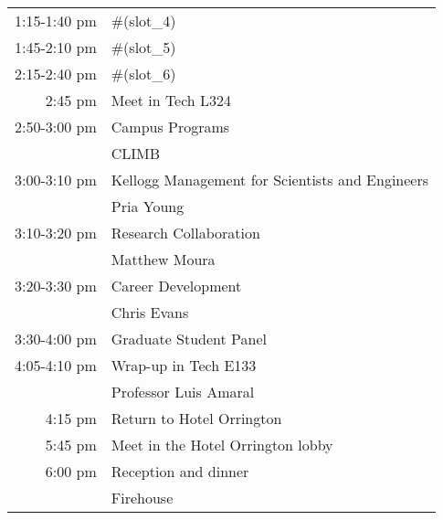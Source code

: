 \documentclass{article}
\begin{document}
\begin{tabular}{ r    l }
1:15-1:40 pm    & #(slot_4) \rule{0cm}{0.4cm} \\ 

1:45-2:10 pm    & #(slot_5) \rule{0cm}{0.4cm} \\ 
 
2:15-2:40 pm    & #(slot_6) \rule{0cm}{0.4cm} \\ 

2:45 pm         & Meet in Tech L324 \rule{0cm}{0.4cm} \\

2:50-3:00 pm    & Campus Programs \rule{0cm}{0.4cm} \\ 
                & \hspace{5mm} CLIMB \\ 

3:00-3:10 pm    & Kellogg Management for Scientists and Engineers \rule{0cm}{0.4cm} \\ 
                & \hspace{5mm} Pria Young \\ 

3:10-3:20 pm    & Research Collaboration \rule{0cm}{0.4cm} \\ 
                & \hspace{5mm} Matthew Moura \\ 
        
3:20-3:30 pm    & Career Development \rule{0cm}{0.4cm} \\ 
                & \hspace{5mm} Chris Evans \\

3:30-4:00 pm    & Graduate Student Panel \rule{0cm}{0.4cm} \\ 

4:05-4:10 pm    & Wrap-up in Tech E133 \rule{0cm}{0.4cm} \\ 
                & \hspace{5mm} Professor Luis Amaral \\ 

4:15 pm         & Return to Hotel Orrington \rule{0cm}{0.4cm} \\ 

5:45 pm         & Meet in the Hotel Orrington lobby \rule{0cm}{0.4cm} \\ 

6:00 pm         & Reception and dinner \rule{0cm}{0.4cm} \\
                & \hspace{5mm} Firehouse \\ 

\end{tabular}
\end{document}

